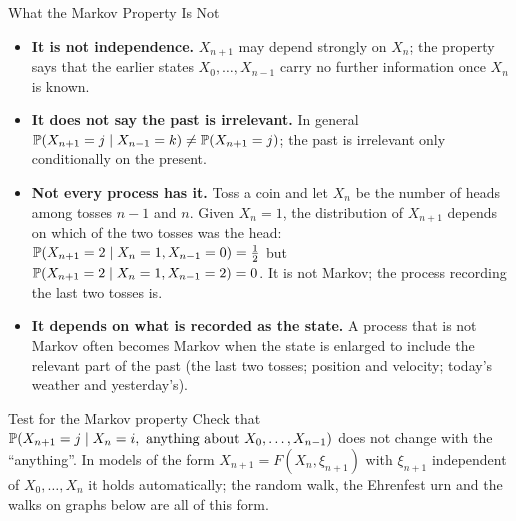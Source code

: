 \begin{frame}{What the Markov Property Is Not}
  \label{fr:mcnot}
  \small
  \begin{itemize}
    \item \textbf{It is not independence.} $X_{n+1}$ may depend strongly on $X_n$; the property says that the earlier states $X_0,\dots,X_{n-1}$ carry no further information once $X_n$ is known.
    \item \textbf{It does not say the past is irrelevant.} In general $\mathbb{P}(X_{n+1}=j\mid X_{n-1}=k)\ne\mathbb{P}(X_{n+1}=j)$; the past is irrelevant only conditionally on the present.
    \item \textbf{Not every process has it.} Toss a coin and let $X_n$ be the number of heads among tosses $n-1$ and $n$. Given $X_n=1$, the distribution of $X_{n+1}$ depends on which of the two tosses was the head: $\mathbb{P}(X_{n+1}=2\mid X_n=1,X_{n-1}=0)=\tfrac12$ but $\mathbb{P}(X_{n+1}=2\mid X_n=1,X_{n-1}=2)=0$. It is not Markov; the process recording the last two tosses is.
    \item \textbf{It depends on what is recorded as the state.} A process that is not Markov often becomes Markov when the state is enlarged to include the relevant part of the past (the last two tosses; position and velocity; today's weather and yesterday's).
  \end{itemize}
  \begin{block}{Test for the Markov property}
    Check that $\mathbb{P}(X_{n+1}=j\mid X_n=i,\ \text{anything about } X_0,\dots,X_{n-1})$ does not change with the ``anything''. In models of the form $X_{n+1}=F(X_n,\xi_{n+1})$ with $\xi_{n+1}$ independent of $X_0,\dots,X_n$ it holds automatically; the random walk, the Ehrenfest urn and the walks on graphs below are all of this form.
  \end{block}
\end{frame}

